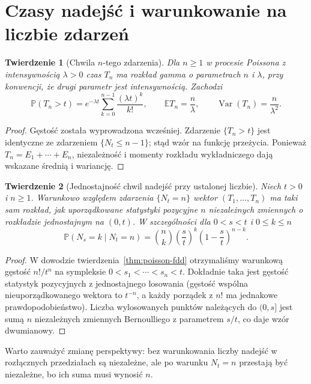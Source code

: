 \documentclass[11pt,a4paper,oneside]{report}
\numberwithin{equation}{chapter}
\theoremstyle{plain}
\newtheorem{twierdzenie}{Twierdzenie}[chapter]
\theoremstyle{definition}
\theoremstyle{remark}
\newcommand{\Prob}{\mathbb{P}}
\newcommand{\E}{\mathbb{E}}
\newcommand{\Var}{\operatorname{Var}}
\begin{document}
\section{Czasy nadejść i warunkowanie na liczbie zdarzeń}
\begin{twierdzenie}[Chwila $n$-tego zdarzenia]
Dla $n\ge1$ w procesie Poissona z intensywnością $\lambda>0$
czas $T_n$ ma rozkład gamma o parametrach $n$ i $\lambda$,
przy konwencji, że drugi parametr jest intensywnością. Zachodzi
\[
\Prob(T_n>t)=e^{-\lambda t}\sum_{k=0}^{n-1}
\frac{(\lambda t)^k}{k!},\qquad
\E T_n=\frac n\lambda,\qquad \Var(T_n)=\frac n{\lambda^2}.
\]
\end{twierdzenie}
\begin{proof}
Gęstość została wyprowadzona wcześniej. Zdarzenie
$\{T_n>t\}$ jest identyczne ze zdarzeniem $\{N_t\le n-1\}$;
stąd wzór na funkcję przeżycia. Ponieważ
$T_n=E_1+\cdots+E_n$, niezależność i momenty rozkładu
wykładniczego dają wskazane średnią i wariancję.
\end{proof}

\begin{twierdzenie}[Jednostajność chwil nadejść przy ustalonej liczbie]
\label{thm:uniform-poisson-times}
Niech $t>0$ i $n\ge1$. Warunkowo względem zdarzenia
$\{N_t=n\}$ wektor $(T_1,\ldots,T_n)$ ma taki sam rozkład,
jak uporządkowane statystyki pozycyjne $n$ niezależnych
zmiennych o rozkładzie jednostajnym na $(0,t)$.
W szczególności dla $0<s<t$ i $0\le k\le n$
\[
\Prob(N_s=k\mid N_t=n)
=\binom nk\left(\frac{s}{t}\right)^k
\left(1-\frac{s}{t}\right)^{n-k}.
\]
\end{twierdzenie}
\begin{proof}
W dowodzie twierdzenia~\ref{thm:poisson-fdd} otrzymaliśmy
warunkową gęstość $n!/t^n$ na sympleksie
$0<s_1<\cdots<s_n<t$. Dokładnie taka jest gęstość
statystyk pozycyjnych z jednostajnego losowania
(gęstość wspólna nieuporządkowanego wektora to $t^{-n}$,
a każdy porządek z $n!$ ma jednakowe prawdopodobieństwo).
Liczba wylosowanych punktów należących do $(0,s]$ jest sumą
$n$ niezależnych zmiennych Bernoulliego z parametrem $s/t$,
co daje wzór dwumianowy.
\end{proof}

Warto zauważyć zmianę perspektywy: bez warunkowania liczby
nadejść w rozłącznych przedziałach są niezależne, ale po warunku
$N_t=n$ przestają być niezależne, bo ich suma musi wynosić $n$.
\end{document}
